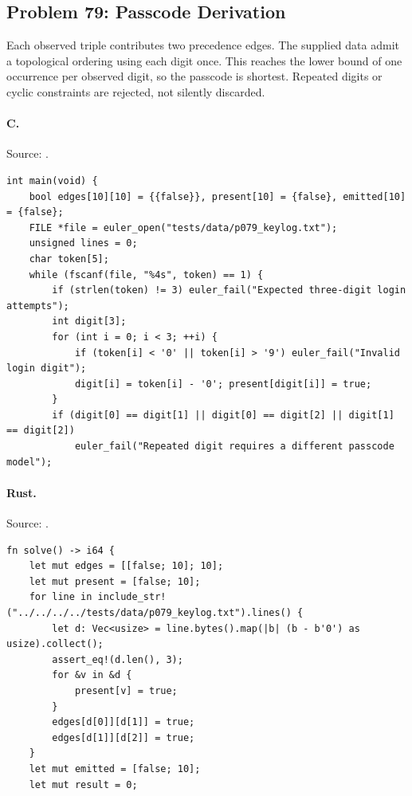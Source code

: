 \subsection{Problem 79: Passcode Derivation}
\label{walkthrough:p79}
Each observed triple contributes two precedence edges. The supplied data admit a topological ordering using each digit once. This reaches the lower bound of one occurrence per observed digit, so the passcode is shortest. Repeated digits or cyclic constraints are rejected, not silently discarded.

\paragraph{C.} Source: .
\begin{lstlisting}
int main(void) {
    bool edges[10][10] = {{false}}, present[10] = {false}, emitted[10] = {false};
    FILE *file = euler_open("tests/data/p079_keylog.txt");
    unsigned lines = 0;
    char token[5];
    while (fscanf(file, "%4s", token) == 1) {
        if (strlen(token) != 3) euler_fail("Expected three-digit login attempts");
        int digit[3];
        for (int i = 0; i < 3; ++i) {
            if (token[i] < '0' || token[i] > '9') euler_fail("Invalid login digit");
            digit[i] = token[i] - '0'; present[digit[i]] = true;
        }
        if (digit[0] == digit[1] || digit[0] == digit[2] || digit[1] == digit[2])
            euler_fail("Repeated digit requires a different passcode model");
\end{lstlisting}

\paragraph{Rust.} Source: .
\begin{lstlisting}
fn solve() -> i64 {
    let mut edges = [[false; 10]; 10];
    let mut present = [false; 10];
    for line in include_str!("../../../../tests/data/p079_keylog.txt").lines() {
        let d: Vec<usize> = line.bytes().map(|b| (b - b'0') as usize).collect();
        assert_eq!(d.len(), 3);
        for &v in &d {
            present[v] = true;
        }
        edges[d[0]][d[1]] = true;
        edges[d[1]][d[2]] = true;
    }
    let mut emitted = [false; 10];
    let mut result = 0;
\end{lstlisting}


